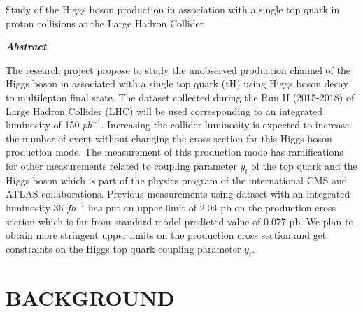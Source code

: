 \documentclass[final,3p]{CSP}
\def\ProjectTitle{Study of the Higgs boson production in association with a single top quark in proton collisions at the Large Hadron Collider}
\begin{document}
\begin{adjustwidth}{1cm}{1cm}

  \begin{center}
    {\Large \ProjectTitle \par}
    \vspace{1cm}
    {\itshape\textbf{Abstract}\par}
  \end{center}
  
  \vspace{1 cm}
 
  
 \onehalfspacing The research project propose to study the unobserved production channel of the Higgs boson in associated with a single top quark (tH) using Higgs boson decay to multilepton final state. The dataset collected during the Run II (2015-2018) of Large Hadron Collider (LHC) will be used corresponding to an integrated luminosity of 150 $pb^{-1}$. Increasing the collider luminosity is expected to increase the number of event without changing the cross section for this Higgs boson production mode. The measurement of this production mode has ramifications for other measurements related to coupling parameter $y_t$ of the top quark and the Higgs boson which is part of the physics program of the international CMS and ATLAS collaborations. Previous measurements using dataset with an integrated luminosity 36 $fb^{-1}$ has put an upper limit of 2.04 pb on the production cross section which is far from standard model predicted value of 0.077 pb. We plan to obtain more stringent upper limits on the production cross section and get constraints on the Higgs top quark coupling parameter $y_t$. \par

\end{adjustwidth}

\hspace{2pt}
\vfill



\newpage
\section{BACKGROUND}
\end{document}
